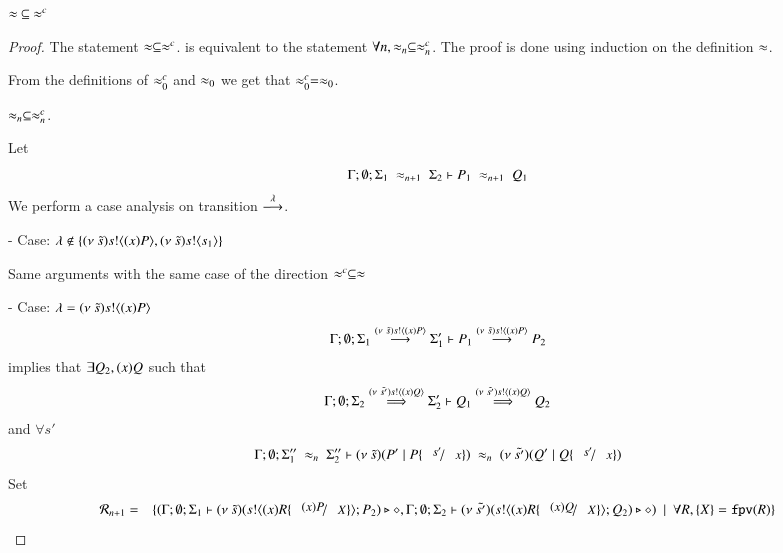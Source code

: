 
\begin{lemma}\rm
	\label{lem:wb_is_wbc}
	$\approx\ \subseteq\ \approx^{c}$
\end{lemma}

\begin{proof}
	The statement $\approx \subseteq \approx^{c}$.
	is equivalent to the statement $\forall n, \approx_n \subseteq \approx^{c}_n$.
	The proof is done using induction on the definition $\approx$.

	 From the definitions of $\approx^{c}_0$ and $\approx_0$ we get that $\approx^{c}_0 = \approx_0$.

	 $\approx_n \subseteq \approx^{c}_n$.

	Let 
	\[
		\Gamma; \emptyset; \Sigma_1\ \wb_{n+1}\ \Sigma_2 \proves P_1\ \wb_{n+1}\ Q_1
	\]
	We perform a case analysis on transition $\stackrel{\lambda}{\longrightarrow}$.

	\noi - Case: $\lambda \notin \{(\nu\ \tilde{s}) s ! \langle (x)P \rangle, (\nu\ \tilde{s}) s ! \langle s_1 \rangle\}$

	\noi Same arguments with the same case of the direction $\approx^{c} \subseteq \approx$


	\noi - Case: $\lambda = (\nu\ \tilde{s}) s ! \langle (x)P \rangle$
%
	\begin{eqnarray}
		\Gamma; \emptyset; \Sigma_1 \stackrel{(\nu\ \tilde{s}) s ! \langle (x)P \rangle}{\longrightarrow} \Sigma_1' \vdash P_1 \stackrel{(\nu\ \tilde{s}) s ! \langle (x)P \rangle}{\longrightarrow} P_2 \label{lem:wb_is_wbc1}
	\end{eqnarray}
%
	\noi implies that
	$\exists Q_2, (x)Q$ such that
	\begin{eqnarray}
		\Gamma; \emptyset; \Sigma_2 \stackrel{(\nu\ \tilde{s'}) s ! \langle (x)Q \rangle}{\Longrightarrow} \Sigma_2' \vdash Q_1 \stackrel{(\nu\ \tilde{s'}) s ! \langle (x)Q \rangle}{\Longrightarrow} Q_2 \label{lem:wb_is_wbc2}
	\end{eqnarray}
%
	\noi and $\forall s'$
	\begin{eqnarray*}
		\Gamma; \emptyset; \Sigma_1''\ \wb_{n}\ \Sigma_2'' \proves \newsp{\tilde{s}}{P' \Par P \subst{s'}{x}}\ \wb_{n}\ 
		\newsp{\tilde{s'}}{Q' \Par Q \subst{s'}{x}}
	\end{eqnarray*}
%
	\noi Set
%
	\begin{eqnarray*}
		\mathcal{R}_{n + 1} &=& \set{	(\Gamma; \emptyset; \Sigma_1 \proves \newsp{\tilde{s}}{\bout{s}{\abs{x}{R \subst{(x) P}{X}}} P_2} \hastype \Proc,
						\Gamma; \emptyset; \Sigma_2 \proves \newsp{\tilde{s'}}{\bout{s}{\abs{x}{R \subst{(x) Q}{X}}} Q_2} \hastype \Proc) \setbar
						\forall R, \set{X} = \fpv{R}}
	\end{eqnarray*}
%


\end{proof}
